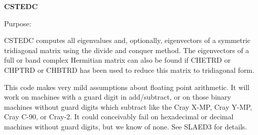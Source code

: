 {\bfseries C\+S\+T\+E\+D\+C} 

 \begin{DoxyParagraph}{Purpose\+: }
\begin{DoxyVerb} CSTEDC computes all eigenvalues and, optionally, eigenvectors of a
 symmetric tridiagonal matrix using the divide and conquer method.
 The eigenvectors of a full or band complex Hermitian matrix can also
 be found if CHETRD or CHPTRD or CHBTRD has been used to reduce this
 matrix to tridiagonal form.

 This code makes very mild assumptions about floating point
 arithmetic. It will work on machines with a guard digit in
 add/subtract, or on those binary machines without guard digits
 which subtract like the Cray X-MP, Cray Y-MP, Cray C-90, or Cray-2.
 It could conceivably fail on hexadecimal or decimal machines
 without guard digits, but we know of none.  See SLAED3 for details.\end{DoxyVerb}
 
\end{DoxyParagraph}

